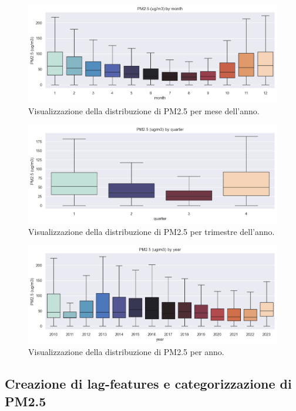 \documentclass[a4paper,12pt]{report}
\begin{document}
	\begin{figure}[H]
		\centering
		\includegraphics[width=1.0\textwidth]{img/bymonth_pm.png}
		\caption{Visualizzazione della distribuzione di PM2.5 per mese dell'anno.}
	\end{figure}
	\begin{figure}[H]
		\centering
		\includegraphics[width=1.0\textwidth]{img/byquarter_pm.png}
		\caption{Visualizzazione della distribuzione di PM2.5 per trimestre dell'anno.}
	\end{figure}
	\begin{figure}[H]
		\centering
		\includegraphics[width=1.0\textwidth]{img/byyear_pm.png}
		\caption{Visualizzazione della distribuzione di PM2.5 per anno.}
	\end{figure}
	
	\subsection{Creazione di lag-features e categorizzazione di PM2.5}
	
\end{document}
